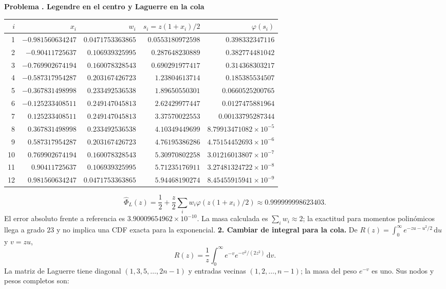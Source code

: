 \documentclass[11pt,a4paper]{article}
\newcommand{\dd}{\,\mathrm d}
\theoremstyle{definition}
\newcounter{problema}
\newenvironment{resuelto}[1]{\refstepcounter{problema}\par\medskip\Needspace{6\baselineskip}\textbf{Problema \theproblema. #1}\par}{\par\medskip}
\begin{document}
\begin{resuelto}{Legendre en el centro y Laguerre en la cola}
\begin{center}\small\begin{tabular}{rrrrr}
\toprule
$i$&$x_i$&$w_i$&$s_i=z(1+x_i)/2$&$\varphi(s_i)$\\
\midrule
1&$-0.981560634247$&$0.0471753363865$&$0.0553180972598$&$0.398332347116$\\
2&$-0.90411725637$&$0.106939325995$&$0.287648230889$&$0.382774481042$\\
3&$-0.769902674194$&$0.160078328543$&$0.690291977417$&$0.314368303217$\\
4&$-0.587317954287$&$0.203167426723$&$1.23804613714$&$0.185385534507$\\
5&$-0.367831498998$&$0.233492536538$&$1.89650550301$&$0.0660525200765$\\
6&$-0.125233408511$&$0.249147045813$&$2.62429977447$&$0.0127475881964$\\
7&$0.125233408511$&$0.249147045813$&$3.37570022553$&$0.00133795287344$\\
8&$0.367831498998$&$0.233492536538$&$4.10349449699$&$8.79913471082\times10^{-5}$\\
9&$0.587317954287$&$0.203167426723$&$4.76195386286$&$4.75154452693\times10^{-6}$\\
10&$0.769902674194$&$0.160078328543$&$5.30970802258$&$3.01216013807\times10^{-7}$\\
11&$0.90411725637$&$0.106939325995$&$5.71235176911$&$3.27481324722\times10^{-8}$\\
12&$0.981560634247$&$0.0471753363865$&$5.94468190274$&$8.45455915941\times10^{-9}$\\
\bottomrule\end{tabular}\end{center}
\[
\widehat\Phi_L(z)=\frac12+\frac z2\sum_iw_i\varphi(z(1+x_i)/2)\approx0.999999998623403.
\]
El error absoluto frente a referencia es $3.90009654962\times10^{-10}$. La masa calculada es $\sum_iw_i\approx2$; la exactitud para momentos polinómicos llega a grado $23$ y no implica una CDF exacta para la exponencial.
\textbf{2. Cambiar de integral para la cola.} De $R(z)=\int_0^\infty e^{-zu-u^2/2}\dd u$ y $v=zu$,
\[
R(z)=\frac1z\int_0^\infty e^{-v}e^{-v^2/(2z^2)}\dd v.
\]
La matriz de Laguerre tiene diagonal $(1,3,5,\ldots,2n-1)$ y entradas vecinas $(1,2,\ldots,n-1)$; la masa del peso $e^{-v}$ es uno. Sus nodos y pesos completos son:


\end{resuelto}
\end{document}
